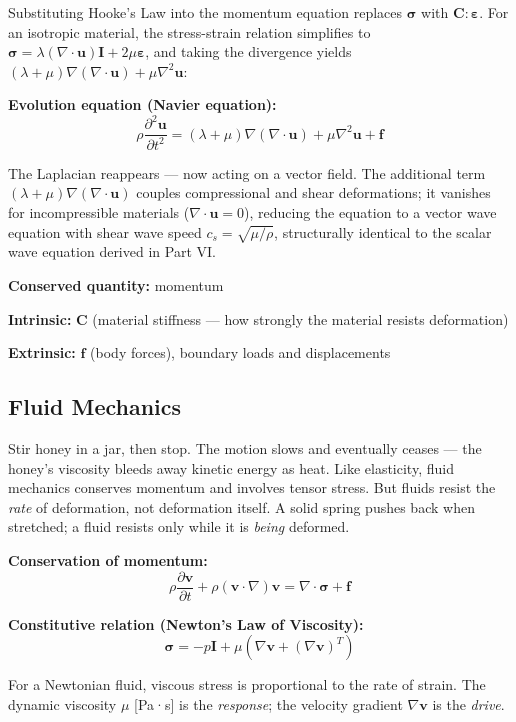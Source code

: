 \documentclass[
  letterpaper,
  DIV=11,
  numbers=noendperiod]{scrartcl}
\begin{document}
Substituting Hooke's Law into the momentum equation replaces
\(\boldsymbol{\sigma}\) with \(\mathbf{C} : \boldsymbol{\varepsilon}\).
For an isotropic material, the stress-strain relation simplifies to
\(\boldsymbol{\sigma} = \lambda(\nabla \cdot \mathbf{u})\mathbf{I} + 2\mu\boldsymbol{\varepsilon}\),
and taking the divergence yields
\((\lambda + \mu)\nabla(\nabla \cdot \mathbf{u}) + \mu\nabla^2\mathbf{u}\):

\textbf{Evolution equation (Navier equation):}
\[\rho \frac{\partial^2 \mathbf{u}}{\partial t^2} = (\lambda + \mu)\nabla(\nabla \cdot \mathbf{u}) + \mu\nabla^2\mathbf{u} + \mathbf{f}\]

The Laplacian reappears --- now acting on a vector field. The additional
term \((\lambda + \mu)\nabla(\nabla \cdot \mathbf{u})\) couples
compressional and shear deformations; it vanishes for incompressible
materials (\(\nabla \cdot \mathbf{u} = 0\)), reducing the equation to a
vector wave equation with shear wave speed \(c_s = \sqrt{\mu/\rho}\),
structurally identical to the scalar wave equation derived in Part VI.

\textbf{Conserved quantity:} momentum

\textbf{Intrinsic:} \(\mathbf{C}\) (material stiffness --- how strongly
the material resists deformation)

\textbf{Extrinsic:} \(\mathbf{f}\) (body forces), boundary loads and
displacements

\subsection{Fluid Mechanics}\label{fluid-mechanics}

Stir honey in a jar, then stop. The motion slows and eventually ceases
--- the honey's viscosity bleeds away kinetic energy as heat. Like
elasticity, fluid mechanics conserves momentum and involves tensor
stress. But fluids resist the \emph{rate} of deformation, not
deformation itself. A solid spring pushes back when stretched; a fluid
resists only while it is \emph{being} deformed.

\textbf{Conservation of momentum:}
\[\rho \frac{\partial \mathbf{v}}{\partial t} + \rho(\mathbf{v} \cdot \nabla)\mathbf{v} = \nabla \cdot \boldsymbol{\sigma} + \mathbf{f}\]

\textbf{Constitutive relation (Newton's Law of Viscosity):}
\[\boldsymbol{\sigma} = -p\mathbf{I} + \mu\left(\nabla \mathbf{v} + (\nabla \mathbf{v})^T\right)\]

For a Newtonian fluid, viscous stress is proportional to the rate of
strain. The dynamic viscosity \(\mu\) {[}Pa·s{]} is the \emph{response};
the velocity gradient \(\nabla \mathbf{v}\) is the \emph{drive}.
\end{document}
